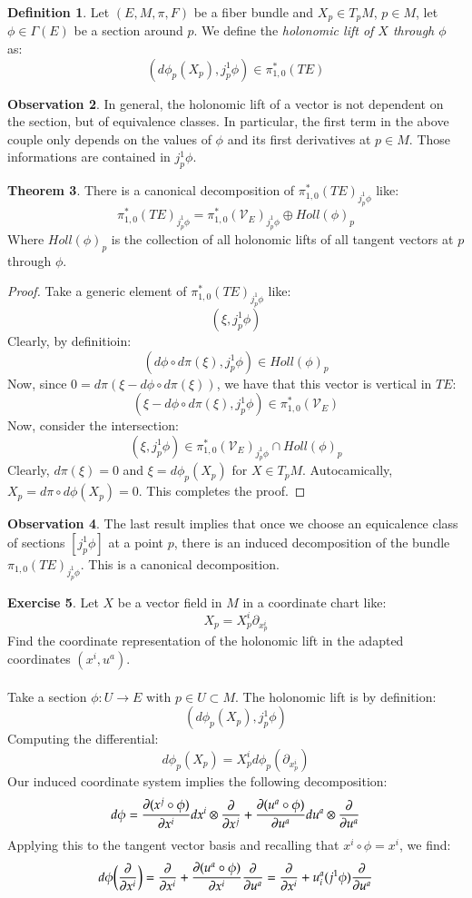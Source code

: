 \documentclass[12pt,a4paper]{report}
\theoremstyle{definition}
\newtheorem{Def}{Definition}[chapter]
\theoremstyle{Theorem}
\newtheorem{Theo}[Def]{Theorem}
\theoremstyle{break}
\newtheorem{Exe}[Def]{Exercise}
\theoremstyle{definition}
\newtheorem{Obs}[Def]{Observation}
\begin{document}
	\begin{Def}
		Let $(E,M,\pi,F)$ be a fiber bundle and $X_p\in T_pM$, $p\in M$, let $\phi\in\Gamma(E)$ be a section around $p$. We define the \textit{holonomic lift of $X$ through $\phi$} as:
		$$(d\phi_p(X_p),j^1_p\phi)\in \pi_{1,0}^*(TE)$$
	\end{Def}
	\begin{Obs}
		In general, the holonomic lift of a vector is not dependent on the section, but of equivalence classes. In particular, the first term in the above couple only depends on the values of $\phi$ and its first derivatives at $p\in M$. Those informations are contained in $j^1_p\phi$.
	\end{Obs}
	\begin{Theo}
		There is a canonical decomposition of $\pi_{1,0}^*(TE)_{j^1_p\phi}$ like:
		$$\pi_{1,0}^*(TE)_{j^1_p\phi}=\pi_{1,0}^*(\mathcal{V}_E)_{j^1_p\phi}\oplus Holl(\phi)_p$$
		Where $Holl(\phi)_p$ is the collection of all holonomic lifts of all tangent vectors at $p$ through $\phi$. 
	\end{Theo}
	\begin{proof}
		Take a generic element of $\pi_{1,0}^*(TE)_{j^1_p\phi}$ like: 
		$$(\xi,j^1_p\phi)$$
		Clearly, by definitioin:
		$$(d\phi\circ d\pi(\xi),j^1_p\phi)\in Holl(\phi)_p$$
		Now, since $0=d\pi(\xi-d\phi\circ d\pi(\xi))$, we have that this vector is vertical in $TE$:
		$$(\xi-d\phi\circ d\pi(\xi),j^1_p\phi)\in \pi_{1,0}^*(\mathcal{V}_E)$$
		Now, consider the intersection:
		$$(\xi,j^1_p\phi)\in \pi_{1,0}^*(\mathcal{V}_E)_{j^1_p\phi}\cap Holl(\phi)_p$$
		Clearly, $d\pi(\xi)=0$ and $\xi=d\phi_p(X_p)$ for $X\in T_pM$. Autocamically, $X_p=d\pi\circ d\phi(X_p)=0$. This completes the proof.
	\end{proof}
	\begin{Obs}
		The last result implies that once we choose an equicalence class of sections $[j^1_p\phi]$ at a point $p$, there is an induced decomposition of the bundle $\pi_{1,0}(TE)_{j^1_p\phi}$. This is a canonical decomposition.
	\end{Obs}
	\begin{Exe}
		Let $X$ be a vector field in $M$ in a coordinate chart like:
		$$X_p=X^i_p\partial_{x_p^i}$$
		Find the coordinate representation of the holonomic lift in the adapted coordinates $(x^i,u^a)$.\\
		\\
		Take a section $\phi:U\rightarrow E$ with $p\in U\subset M$. The holonomic lift is by definition:
		$$(d\phi_p(X_p),j^1_p\phi)$$
		Computing the differential:
		$$d\phi_p(X_p)=X_p^id\phi_p(\partial_{x_p^i})$$
		Our induced coordinate system implies the following decomposition:
		$$d\phi={\partial (x^j\circ\phi)\over \partial x^i}dx^i\otimes {\partial \over \partial x^j}+{\partial (u^a\circ\phi) \over \partial u^a}du^a\otimes {\partial\over \partial u^a}$$
	    Applying this to the tangent vector basis and recalling that $x^i\circ \phi=x^i$, we find:
		$$d\phi\bigg({\partial\over \partial x^i}\bigg)={\partial \over \partial x^i}+{\partial (u^a\circ\phi) \over \partial x^i}{\partial\over \partial u^a}={\partial \over \partial x^i}+u^a_i(j^1\phi){\partial\over \partial u^a}$$
	\end{Exe}
\end{document}
